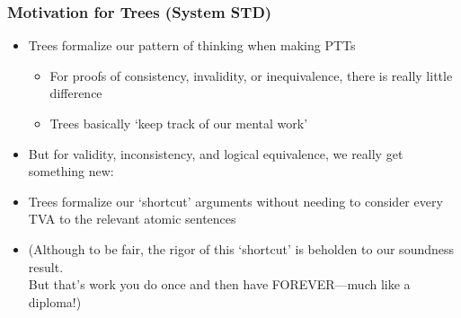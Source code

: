 \begin{frame}
\frametitle{Motivation for Trees (System STD)}

\begin{itemize}[<+->]

\item Trees formalize our pattern of thinking when making PTTs

\begin{itemize}

\item For proofs of consistency, invalidity, or inequivalence, there is really little difference

\item Trees basically `keep track of our mental work'

\end{itemize}

\bigskip

\item But for validity, inconsistency, and logical equivalence, we really get something new:

\item Trees formalize our `shortcut' arguments  without needing to consider every TVA to the relevant atomic sentences

\medskip 

\item \scriptsize{(Although to be fair, the rigor of this `shortcut' is beholden to our soundness result. \\ But that's work you do once and then have FOREVER---much like a diploma!)}

\end{itemize}
\end{frame}

